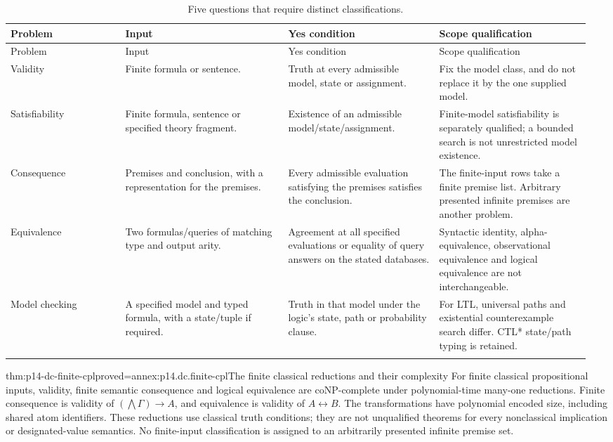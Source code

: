 \begin{landscape}
\begingroup\small\setlength{\tabcolsep}{3pt}
\begin{longtable}{@{}p{0.19\linewidth}p{0.27\linewidth}p{0.25\linewidth}p{0.25\linewidth}@{}}
\caption{Five questions that require distinct classifications.}\label{tab:p14-dc-questions}\\
\toprule
Problem & Input & Yes condition & Scope qualification\\\midrule
\endfirsthead
\toprule
Problem & Input & Yes condition & Scope qualification\\\midrule
\endhead
\bottomrule
\endfoot
Validity & Finite formula or sentence. & Truth at every admissible model, state or assignment. & Fix the model class, and do not replace it by the one supplied model.\\\addlinespace
Satisfiability & Finite formula, sentence or specified theory fragment. & Existence of an admissible model/state/assignment. & Finite-model satisfiability is separately qualified; a bounded search is not unrestricted model existence.\\\addlinespace
Consequence & Premises and conclusion, with a representation for the premises. & Every admissible evaluation satisfying the premises satisfies the conclusion. & The finite-input rows take a finite premise list. Arbitrary presented infinite premises are another problem.\\\addlinespace
Equivalence & Two formulas/queries of matching type and output arity. & Agreement at all specified evaluations or equality of query answers on the stated databases. & Syntactic identity, alpha-equivalence, observational equivalence and logical equivalence are not interchangeable.\\\addlinespace
Model checking & A specified model and typed formula, with a state/tuple if required. & Truth in that model under the logic's state, path or probability clause. & For LTL, universal paths and existential counterexample search differ. CTL* state/path typing is retained.\\\addlinespace
\end{longtable}
\endgroup
\end{landscape}

\begin{hbtheorem}{thm:p14-dc-finite-cpl}{proved=annex:p14.dc.finite-cpl}{The finite classical reductions and their complexity}
For finite classical propositional inputs, validity, finite semantic
consequence and logical equivalence are coNP-complete under polynomial-time
many-one reductions. Finite consequence is validity of
\((\bigwedge\Gamma)\to A\), and equivalence is validity of \(A\leftrightarrow B\).
The transformations have polynomial encoded size, including shared atom
identifiers. These reductions use classical truth conditions; they are not
unqualified theorems for every nonclassical implication or designated-value
semantics. No finite-input classification is assigned to an arbitrarily
presented infinite premise set.
\end{hbtheorem}

